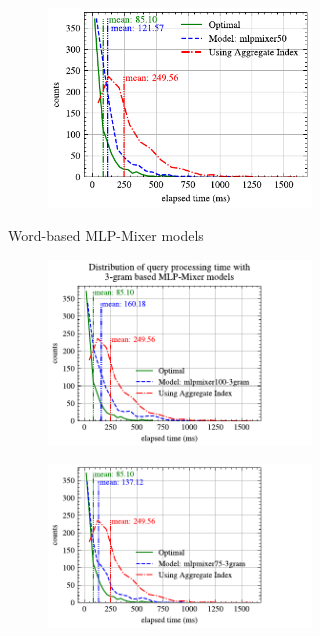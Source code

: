 \begin{figure}[!h]
\begin{subfigure}{0.45\textwidth}
\begin{subfigure}{\textwidth}
			\includegraphics[]{my/graphics/perf_dist_mlpmixer50_A.pdf}
		\end{subfigure}
		\caption{Word-based MLP-Mixer models}
	\end{subfigure}
	\hfill
	\begin{subfigure}{0.45\textwidth}
		\begin{subfigure}{\textwidth}
			\centering
			\includegraphics[]{my/graphics/perf_dist_mlpmixer100_3gram_A.pdf}
		\end{subfigure}
		\vfill
		\begin{subfigure}{\textwidth}
			\centering
			\includegraphics[]{my/graphics/perf_dist_mlpmixer75_3gram_A.pdf}

\end{subfigure}
\end{subfigure}
\end{figure}
